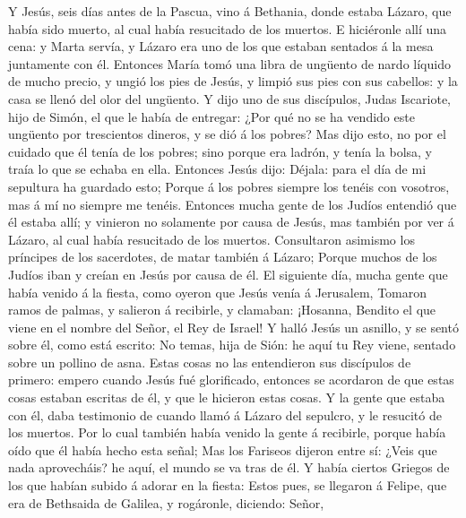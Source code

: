  Y Jesús, seis días antes de la Pascua, vino á Bethania,
donde estaba Lázaro, que había sido muerto, al cual había resucitado de
los muertos.  E hiciéronle allí una cena: y Marta servía,
y Lázaro era uno de los que estaban sentados á la mesa juntamente con
él.  Entonces María tomó una libra de ungüento de nardo
líquido de mucho precio, y ungió los pies de Jesús, y limpió sus pies
con sus cabellos: y la casa se llenó del olor del ungüento.
 Y dijo uno de sus discípulos, Judas Iscariote, hijo de
Simón, el que le había de entregar:  ¿Por qué no se ha
vendido este ungüento por trescientos dineros, y se dió á los pobres?
 Mas dijo esto, no por el cuidado que él tenía de los
pobres; sino porque era ladrón, y tenía la bolsa, y traía lo que se
echaba en ella.  Entonces Jesús dijo: Déjala: para el día
de mi sepultura ha guardado esto;  Porque á los pobres
siempre los tenéis con vosotros, mas á mí no siempre me tenéis.
 Entonces mucha gente de los Judíos entendió que él estaba
allí; y vinieron no solamente por causa de Jesús, mas también por ver á
Lázaro, al cual había resucitado de los muertos. 
Consultaron asimismo los príncipes de los sacerdotes, de matar también á
Lázaro;  Porque muchos de los Judíos iban y creían en
Jesús por causa de él.  El siguiente día, mucha gente que
había venido á la fiesta, como oyeron que Jesús venía á Jerusalem,
 Tomaron ramos de palmas, y salieron á recibirle, y
clamaban: ¡Hosanna, Bendito el que viene en el nombre del Señor, el Rey
de Israel!  Y halló Jesús un asnillo, y se sentó sobre
él, como está escrito:  No temas, hija de Sión: he aquí
tu Rey viene, sentado sobre un pollino de asna.  Estas
cosas no las entendieron sus discípulos de primero: empero cuando Jesús
fué glorificado, entonces se acordaron de que estas cosas estaban
escritas de él, y que le hicieron estas cosas.  Y la
gente que estaba con él, daba testimonio de cuando llamó á Lázaro del
sepulcro, y le resucitó de los muertos.  Por lo cual
también había venido la gente á recibirle, porque había oído que él
había hecho esta señal;  Mas los Fariseos dijeron entre
sí: ¿Veis que nada aprovecháis? he aquí, el mundo se va tras de él.
 Y había ciertos Griegos de los que habían subido á
adorar en la fiesta:  Estos pues, se llegaron á Felipe,
que era de Bethsaida de Galilea, y rogáronle, diciendo: Señor,
